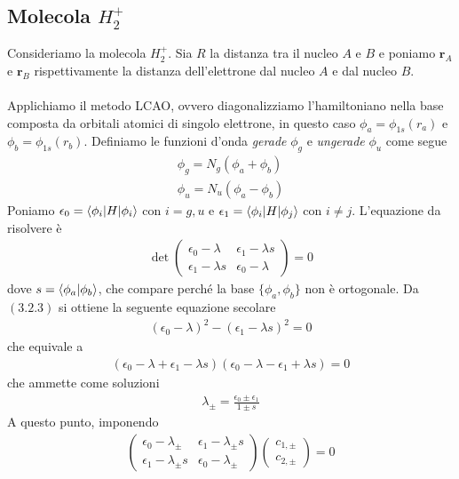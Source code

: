 \documentclass{article}
\begin{document}
\newpage
\subsection{Molecola $H^+_2$}
Consideriamo la molecola $H^+_2$. Sia $R$ la distanza tra il nucleo $A$ e $B$ e poniamo $\mathbf{r}_A$ e $\mathbf{r}_B$ rispettivamente la distanza dell'elettrone dal nucleo $A$ e dal nucleo $B$. \\ \\
Applichiamo il metodo LCAO, ovvero diagonalizziamo l'hamiltoniano nella base composta da orbitali atomici di singolo elettrone, in questo caso $\phi_a = \phi_{1s}(r_a)$ e $\phi_b = \phi_{1s}(r_b)$. Definiamo le funzioni d'onda \textit{gerade} $\phi_g$ e \textit{ungerade} $\phi_u$ come segue 
\begin{align}
    \phi_g = N_g(\phi_a + \phi_b) \tag{3.2.1} \\
    \phi_u = N_u(\phi_a - \phi_b) \tag{3.2.2}
\end{align}
Poniamo $\epsilon_0 = \braket{\phi_i|H|\phi_i}$ con $i = g, u$ e $\epsilon_1 = \braket{\phi_i|H|\phi_j}$ con $i \neq j$. L'equazione da risolvere è 
\begin{align}
    \det\begin{pmatrix}
        \epsilon_0 - \lambda & \epsilon_1 - \lambda s \\
        \epsilon_1 - \lambda s & \epsilon_0 - \lambda
    \end{pmatrix} = 0 \tag{3.2.3}
\end{align}
dove $s = \braket{\phi_a|\phi_b}$, che compare perché la base $\{\phi_a, \phi_b\}$ non è ortogonale. Da $(3.2.3)$ si ottiene la seguente equazione secolare 
\begin{align}
    (\epsilon_0 - \lambda)^2 - (\epsilon_1 - \lambda s)^2 = 0 \tag{3.2.4}
\end{align}
che equivale a 
\begin{align}
    (\epsilon_0 - \lambda + \epsilon_1 - \lambda s)(\epsilon_0 - \lambda - \epsilon_1 + \lambda s) = 0 \tag{3.2.5}
\end{align}
che ammette come soluzioni 
\begin{align}
    \lambda_{\pm} = \frac{\epsilon_0 \pm \epsilon_1}{1 \pm s} \tag{3.2.6}
\end{align}
A questo punto, imponendo 
\begin{align}
    \begin{pmatrix}
        \epsilon_0 - \lambda_\pm & \epsilon_1 - \lambda_\pm s \\
        \epsilon_1 - \lambda_\pm s & \epsilon_0 - \lambda_\pm
    \end{pmatrix}
    \begin{pmatrix}
        c_{1, \pm} \\
        c_{2, \pm}
    \end{pmatrix} = 0 \tag{3.2.7}
\end{align}
\end{document}
